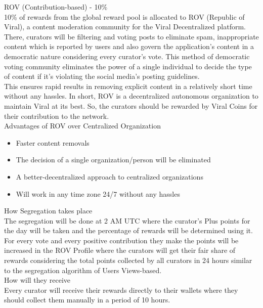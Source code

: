 \documentclass[10pt]{article}
\begin{document}
ROV (Contribution-based) - 10\%\\

10\% of rewards from the global reward pool is allocated to ROV (Republic of Viral), a content moderation community for the Viral Decentralized platform. There, curators will be filtering and voting posts to eliminate spam, inappropriate content which is reported by users and also govern the application's content in a democratic nature considering every curator's vote. This method of democratic voting community eliminates the power of a single individual to decide the type of content if it's violating the social media's posting guidelines. \\

This ensures rapid results in removing explicit content in a relatively short time without any hassles. In short, ROV is a decentralized autonomous organization to maintain Viral at its best. So, the curators should be rewarded by Viral Coins for their contribution to the network.\\

Advantages of ROV over Centralized Organization\\
\begin{itemize}[leftmargin=+0.2in]
\item Faster content removals
\item The decision of a single organization/person will be eliminated
\item A better-decentralized approach to centralized organizations
\item Will work in any time zone 24/7 without any hassles
\end{itemize}


How Segregation takes place\\

The segregation will be done at 2 AM UTC where the curator's Plus points for the day will be taken and the percentage of rewards will be determined using it. For every vote and every positive contribution they make the points will be increased in the ROV Profile where the curators will get their fair share of rewards considering the total points collected by all curators in 24 hours similar to the segregation algorithm of Users Views-based.\\

How will they receive\\

Every curator will receive their rewards directly to their wallets where they should collect them manually in a period of 10 hours.\\
\end{document}
